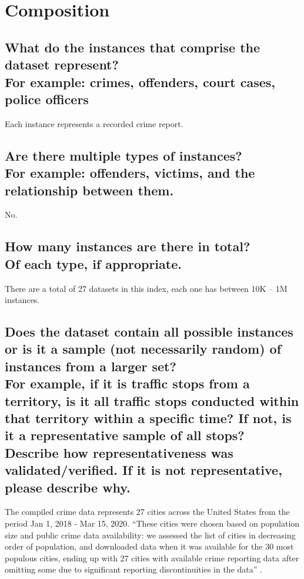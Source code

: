 \documentclass[letterpaper, 10 pt, conference]{ieeeconf}  %
\newcommand{\subtitle}[1]{{\\ \small \normalfont \color{purple} #1}}
\begin{document}
\section{Composition}

\subsection{What do the instances that comprise the dataset represent? \subtitle{For example: crimes, offenders, court cases, police officers}}

Each instance represents a recorded crime report.

\subsection{Are there multiple types of instances? \subtitle{For example: offenders, victims, and the relationship between them.}}

No.

\subsection{How many instances are there in total? \subtitle{Of each type, if appropriate.}}

There are a total of 27 datasets in this index, each one has between 10K -- 1M instances.

\subsection{Does the dataset contain all possible instances or is it a sample (not necessarily random) of instances from a larger set? \subtitle{For example, if it is traffic stops from a territory, is it all traffic stops conducted within that territory within a specific time? If not, is it a representative sample of all stops? Describe how representativeness was validated/verified. If it is not representative, please describe why.}}

The compiled crime data represents 27 cities across the United States from the period Jan 1, 2018 - Mar 15, 2020. ``These cities were chosen based on population size and public crime data availability: we assessed the list of cities in decreasing order of population, and downloaded data when it was available for the 30 most populous cities, ending up with 27 cities with available crime reporting data after omitting some due to significant reporting discontinuities in the data'' \cite{zhou2721empirical}.
\end{document}
